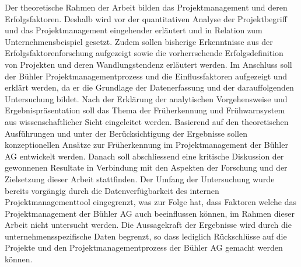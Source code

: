 Der theoretische Rahmen der Arbeit bilden das Projektmanagement und deren Erfolgsfaktoren. Deshalb wird vor 
der quantitativen Analyse der Projektbegriff und das Projektmanagement eingehender erläutert und in Relation zum Unternehmensbeispiel gesetzt. Zudem sollen bisherige Erkenntnisse aus der Erfolgsfaktorenforschung aufgezeigt sowie die vorherrschende Erfolgsdefinition von Projekten und deren Wandlungstendenz erläutert werden. Im Anschluss soll der Bühler Projektmanagementprozess und die Einflussfaktoren aufgezeigt und erklärt werden, da er die Grundlage der Datenerfassung und der darauffolgenden Untersuchung bildet. 
\newline\newline
Nach der Erklärung der analytischen Vorgehensweise und Ergebnispräsentation soll das Thema der Früherkennung und Frühwarnsystem aus wissenschaftlicher Sicht eingeleitet werden. Basierend auf den theoretischen Ausführungen und unter der Berücksichtigung der Ergebnisse sollen konzeptionellen Ansätze zur Früherkennung im Projektmanagement der Bühler AG entwickelt werden. Danach soll abschliessend eine kritische Diskussion der gewonnenen Resultate in Verbindung mit den Aspekten der Forschung und der Zielsetzung dieser Arbeit stattfinden.
\newline\newline 
Der Umfang der Untersuchung wurde bereits vorgängig durch die Datenverfügbarkeit des internen Projektmanagementtool eingegrenzt, was zur Folge hat, dass Faktoren welche das Projektmanagement der Bühler AG auch beeinflussen können, im Rahmen dieser Arbeit nicht untersucht werden. Die Aussagekraft der Ergebnisse wird durch die unternehmensspezifische Daten begrenzt, so dass lediglich Rückschlüsse auf die Projekte und den Projektmanagementprozess der Bühler AG gemacht werden können.
